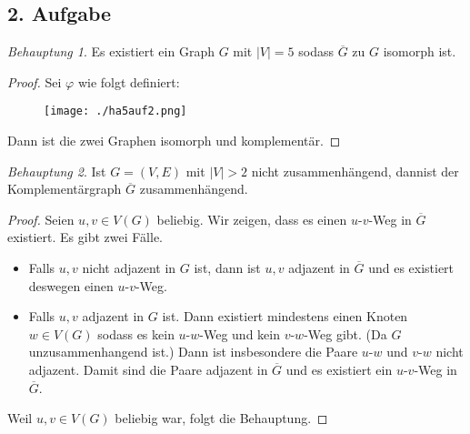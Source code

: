 \documentclass[a5paper]{article}
\providecommand{\abs}[1]{\left\lvert#1\right\rvert}
\theoremstyle{remark}
\newtheorem*{Behauptung}{Behauptung}
\begin{document}
\subsection{2. Aufgabe}
\begin{Behauptung}
  Es existiert ein Graph \(G\) mit \(\abs{V} = 5\) sodass \(\overline{G}\)
  zu \(G\) isomorph ist.
\end{Behauptung}
\begin{proof}
  Sei \(\varphi\) wie folgt definiert:
\begin{figure}[h]
  \centering
  \texttt{[image: ./ha5auf2.png]}
\end{figure}

  Dann ist die zwei Graphen isomorph und komplementär.
\end{proof}
\begin{Behauptung}
  Ist \(G = (V, E)\) mit \(\abs{V}> 2\) nicht zusammenhängend, dannist der
  Komplementärgraph \(\overline{G}\) zusammenhängend.
\end{Behauptung}
\begin{proof}
  Seien \(u, v \in V(G)\) beliebig.  Wir zeigen, dass es einen
  \(u\)-\(v\)-Weg in \(\overline{G}\) existiert. Es gibt zwei Fälle.
  \begin{itemize}
  \item Falls \(u, v\) nicht adjazent in \(G\) ist, dann ist \(u, v\)
    adjazent in \(\overline{G}\) und es existiert deswegen einen
    \(u\)-\(v\)-Weg.
  \item Falls \(u, v\) adjazent in \(G\) ist.  Dann existiert mindestens
    einen Knoten \(w \in V(G)\) sodass es kein \(u\)-\(w\)-Weg und kein
    \(v\)-\(w\)-Weg gibt.  (Da \(G\) unzusammenhangend ist.) Dann ist
    insbesondere die Paare \(u\)-\(w\) und \(v\)-\(w\) nicht adjazent.  Damit
    sind die Paare adjazent in \(\overline{G}\) und es existiert ein
    \(u\)-\(v\)-Weg in \(\overline{G}\).
  \end{itemize}
  Weil \(u, v \in V(G)\)  beliebig war, folgt die Behauptung.
\end{proof}
\end{document}
